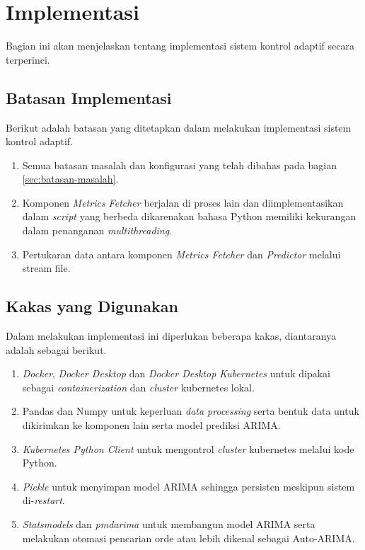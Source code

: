 \section{Implementasi}

Bagian ini akan menjelaskan tentang implementasi sistem kontrol adaptif secara terperinci.

\subsection{Batasan Implementasi}
Berikut adalah batasan yang ditetapkan dalam melakukan implementasi sistem kontrol adaptif.
\begin{enumerate}
    \item Semua batasan masalah dan konfigurasi yang telah dibahas pada bagian \ref{sec:batasan-masalah}.
    \item Komponen \textit{Metrics Fetcher} berjalan di proses lain dan diimplementasikan dalam \textit{script} yang berbeda dikarenakan bahasa Python memiliki kekurangan dalam penanganan \textit{multithreading}.
    \item Pertukaran data antara komponen \textit{Metrics Fetcher} dan \textit{Predictor} melalui stream file.
\end{enumerate}

\subsection{Kakas yang Digunakan}
Dalam melakukan implementasi ini diperlukan beberapa kakas, diantaranya adalah sebagai berikut.
\begin{enumerate}
    \item \textit{Docker}, \textit{Docker Desktop} dan \textit{Docker Desktop Kubernetes} untuk dipakai sebagai \textit{containerization} dan \textit{cluster} kubernetes lokal.
    \item Pandas dan Numpy untuk keperluan \textit{data processing} serta bentuk data untuk dikirimkan ke komponen lain serta model prediksi ARIMA.
    \item \textit{Kubernetes Python Client} untuk mengontrol \textit{cluster} kubernetes melalui kode Python.
    \item \textit{Pickle} untuk menyimpan model ARIMA sehingga persisten meskipun sistem di-\textit{restart}.
    \item \textit{Statsmodels} dan \textit{pmdarima} untuk membangun model ARIMA serta melakukan otomasi pencarian orde atau lebih dikenal sebagai Auto-ARIMA.
\end{enumerate}

